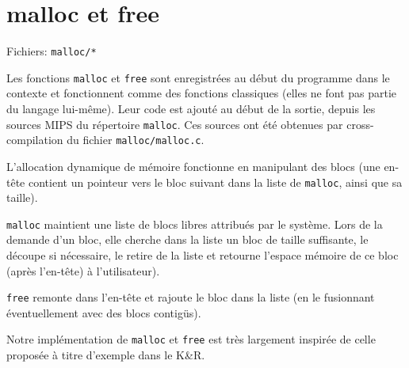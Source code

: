 \documentclass{article}
\begin{document}
	\section{malloc et free}
		\par Fichiers: \verb#malloc/*#
		\par Les fonctions \verb#malloc# et \verb#free# sont enregistrées au début du programme dans le contexte et fonctionnent comme des fonctions classiques (elles ne font pas partie du langage lui-même). Leur code est ajouté au début de la sortie, depuis les sources MIPS du répertoire \verb#malloc#. Ces sources ont été obtenues par cross-compilation du fichier \verb#malloc/malloc.c#.
		\par L'allocation dynamique de mémoire fonctionne en manipulant des blocs (une en-tête contient un pointeur vers le bloc suivant dans la liste de \verb#malloc#, ainsi que sa taille).
		\par \verb#malloc# maintient une liste de blocs libres attribués par le système. Lors de la demande d'un bloc, elle cherche dans la liste un bloc de taille suffisante, le découpe si nécessaire, le retire de la liste et retourne l'espace mémoire de ce bloc (après l'en-tête) à l'utilisateur).
		\par \verb#free# remonte dans l'en-tête et rajoute le bloc dans la liste (en le fusionnant éventuellement avec des blocs contigüs).
		\par Notre implémentation de \verb#malloc# et \verb#free# est très largement inspirée de celle proposée à titre d'exemple dans le K\&R.
\end{document}
